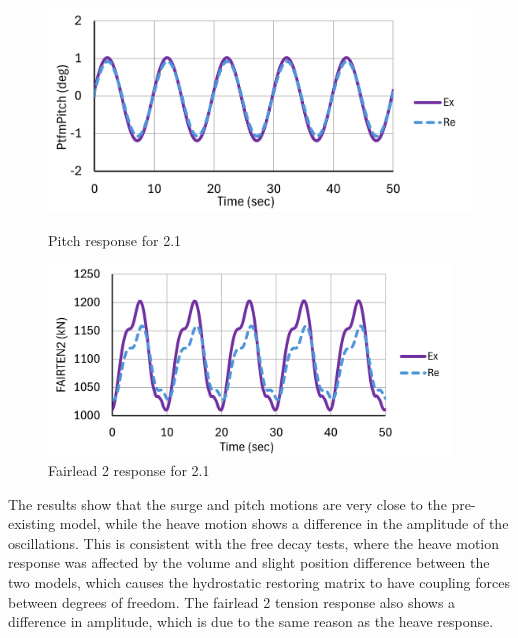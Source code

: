 \documentclass[a4paper, 11pt]{article}
\begin{document}
\begin{figure}[H]
    \begin{minipage}{0.48\textwidth}
        \centering
        \includegraphics[width=1\textwidth]{2.1_pitch_mine_1.png}
        \caption{\small Pitch response for 2.1}
        \label{fig:2.1_pitch_mine_recreated}
    \end{minipage}
    \hfill
    \begin{minipage}{0.5\textwidth}
        \centering
        \includegraphics[width=0.95\textwidth]{2.1_fairten2_mine_1.png}
        \caption{\small Fairlead 2 response for 2.1}
        \label{fig:2.1_fairten2_mine_recreated}
    \end{minipage}
\end{figure}

The results show that the surge and pitch motions are very close to the pre-existing model, while the heave motion shows a difference in the amplitude of the oscillations. This is consistent with the free decay tests, where the heave motion response was affected by the volume and slight position difference between the two models, which causes the hydrostatic restoring matrix to have coupling forces between degrees of freedom. The fairlead 2 tension response also shows a difference in amplitude, which is due to the same reason as the heave response.
\end{document}
